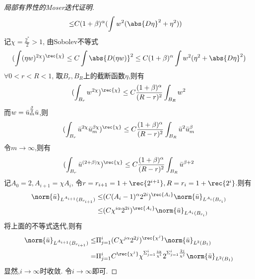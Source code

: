 \begin{proof}[局部有界性的Moser迭代证明]
\begin{equation}
\begin{split}
            \le & C(1+\beta)^\alpha ( \int w^2(\abs{D\eta}^2+\eta^2))
        \end{split}
    \end{equation}
    记$\chi = \frac{2^*}{2}>1$, 由Sobolev不等式
    \begin{equation}
        (\int (\eta w)^{2\chi })^\rec{\chi} \le C \int \abs{D(\eta w)}^2 \le C(1+\beta)^\alpha\int w^2(\eta^2 +\abs{D\eta}^2)
    \end{equation}
    $\forall 0< r < R <1$, 取$B_r, B_R$上的截断函数$\eta$,则有 
    \begin{equation}
        (\int _{B_r}w^{2\chi})^\rec{\chi} \le C\frac{(1+\beta)^\alpha}{(R-r)^2} \int _{B_R}w^2
    \end{equation}
    而$w={\bar{u}_m^{\frac{\beta}{2}}} {\bar{u}}$,则
    \begin{equation}
        (\int _{B_r}\ub^{2\chi}\um^{\beta \chi })^\rec{\chi} \le C \frac{(1+\beta)^\alpha}{(R-r)^2}\int_{B_R} \ub^2\um^\beta
    \end{equation}
    令$m \to \infty$,则有 
    \begin{equation}
        (\int_{B_r}\ub^{(2+\beta)\chi})^\rec{\chi} \le C \frac{(1+\beta)^\alpha}{(R-r)^2}\int_{B_R}\ub^{\beta+2}
    \end{equation}
    记$A_0=2, A_{i+1}=\chi A_i$, 令$r=r_{i+1}=1+\rec{2^{i+1}}, R=r_i=1+\rec{2^i}$.则有
    \begin{equation}
        \begin{split}
            \norm{\ub}_{L^{A_{i+1}}(B_{r_{i+1}})} \le & (C(A_i-1)^\alpha 2^{2i})^{\rec{A_i}}\norm{\ub}_{L^{A_i}(B_{r_i})} \\
            \le &(C\chi^{i\alpha}2^{2i})^\rec{A_i} \norm{\ub}_{L^{A_i}(B_{r_i})}
        \end{split}
    \end{equation}
    将上面的不等式迭代,则有
    \begin{equation}
        \begin{split}
            \norm{\ub}_{L^{A_{i+1}}(B_{r_{i+1}})}\le & \Pi_{j=1}^i(C\chi^{j\alpha}2^{2j})^\rec{\chi^j} \norm{\ub}_{L^2(B_1)} \\
            =&\Pi_{j=1}^iC^\rec{\chi^j}\chi^{\Sigma^i_{j=1}\frac{i\alpha}{\chi^i}}2^{\Sigma_{j=1}^i\frac{2j}{\chi^j}} \norm{\ub}_{L^2(B_1)}
        \end{split}
    \end{equation}
    显然,$i \to \infty$时收敛. 令$i \to \infty$即可.
\end{proof}
